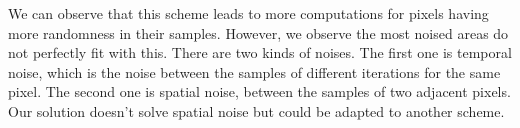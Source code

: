 \documentclass[acmsmall]{acmart}
\begin{document}
We can observe that this scheme leads to more computations for pixels having more randomness in their samples. However, we observe the most noised areas do not perfectly fit with this.
There are two kinds of noises. The first one is temporal noise, which is the noise between the samples of different iterations for the same pixel. The second one is spatial noise, between the samples of two adjacent pixels.
Our solution doesn't solve spatial noise but could be adapted to another scheme.
\end{document}
